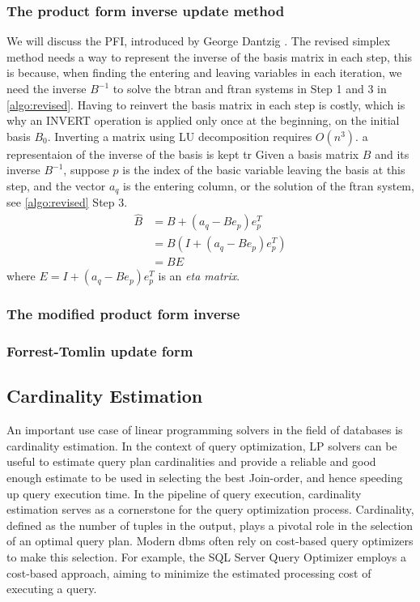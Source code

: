 \subsubsection*{The product form inverse update method}
We will discuss the PFI, introduced by George Dantzig \parencite{dantzig1954product}.
The revised simplex method needs a way to represent the inverse of the
basis matrix in each step, this is because, when
finding the entering and leaving variables in each iteration,
we need the inverse $B^{-1}$ to solve the \gls{btran}
and \gls{ftran} systems in Step 1 and 3 in \ref{algo:revised}.
Having to reinvert the basis matrix in each step is costly, which is why
an INVERT operation is applied only once at the beginning, on the initial basis
$B_0$. Inverting a matrix using LU decomposition requires $O(n^3)$.
a representaion of the inverse of the basis is kept tr
Given a basis matrix \( B \) and its inverse \( B^{-1} \),
suppose $p$ is the index of the basic variable leaving the basis at this step,
and the vector $a_q$ is the entering column, or the solution of the \gls{ftran}
system, see \ref{algo:revised} Step 3.
\begin{align*}
    \hat{B} & = B + (a_q - B e_p) e_p^T     \\
            & = B (I + (a_q - B e_p) e_p^T) \\
            & = B E
\end{align*}
where \( E = I + (a_q - B e_p) e_p^T \) is an \textit{eta matrix}.


\subsubsection*{The modified product form inverse}

\subsubsection*{Forrest-Tomlin update form}

\subsection{Cardinality Estimation}\label{subsection:cardinality-estimate}
An important use case of linear programming solvers in the field of databases is 
cardinality estimation.
In the context of query optimization, LP solvers can be useful to estimate query plan
cardinalities and provide a reliable and good enough estimate to be used in selecting
the best Join-order, and hence speeding up query execution time.
In the pipeline of query execution, cardinality estimation serves
as a cornerstone for the query optimization process.
Cardinality, defined as the number of tuples in the output,
plays a pivotal role in the selection of an optimal query plan.
Modern \gls{dbms} often rely on
cost-based query optimizers to make this selection.
For example, the SQL Server Query Optimizer
\parencite{microsoft2023cardinality} employs a
cost-based approach, aiming to minimize the estimated
processing cost of executing a query.

